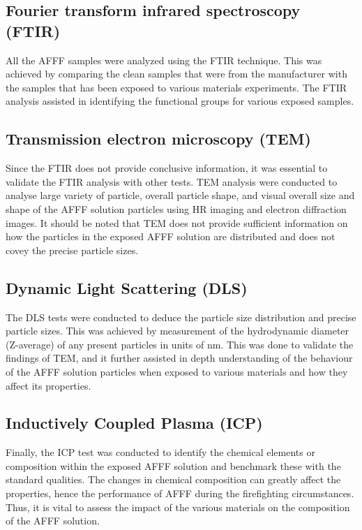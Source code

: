 \documentclass[12pt]{report}
\begin{document}
\subsection{Fourier transform infrared spectroscopy (FTIR)}
All the AFFF samples were analyzed using the FTIR technique. This was achieved by comparing the clean samples that were from the manufacturer with the samples that has been exposed to various materials experiments. The FTIR analysis assisted in identifying the functional groups for various exposed samples.
 

\subsection{Transmission electron microscopy (TEM)}
Since the FTIR does not provide conclusive information, it was essential to validate the FTIR analysis with other tests. TEM analysis were conducted to analyse large variety of particle, overall particle shape, and visual overall size and shape of the AFFF solution particles using HR imaging and electron diffraction images. It should be noted that TEM does not provide sufficient information on how the particles in the exposed AFFF solution are distributed and does not covey the precise particle sizes. 
 

\subsection{Dynamic Light Scattering (DLS)}
The DLS tests were conducted to deduce the particle size distribution and precise particle sizes. This was achieved by measurement of the hydrodynamic diameter (Z-average) of any present particles in units of nm. This was done to validate the findings of TEM, and it further assisted in depth understanding of the behaviour of the AFFF solution particles when exposed to various materials and how they affect its properties.  
 

\subsection{Inductively Coupled Plasma (ICP)}
Finally, the ICP test was conducted to identify the chemical elements or composition within the exposed AFFF solution and benchmark these with the standard qualities. The changes in chemical composition can greatly affect the properties, hence the performance of AFFF during the firefighting circumstances. Thus, it is vital to assess the impact of the various materials on the composition of the AFFF solution. 
 
\end{document}
